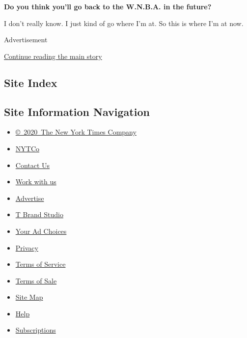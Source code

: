\textbf{Do you think you'll go back to the W.N.B.A. in the future?}

I don't really know. I just kind of go where I'm at. So this is where
I'm at now.

Advertisement

\protect\hyperlink{after-bottom}{Continue reading the main story}

\hypertarget{site-index}{%
\subsection{Site Index}\label{site-index}}

\hypertarget{site-information-navigation}{%
\subsection{Site Information
Navigation}\label{site-information-navigation}}

\begin{itemize}
\tightlist
\item
  \href{https://help.nytimes.com/hc/en-us/articles/115014792127-Copyright-notice}{©~2020~The
  New York Times Company}
\end{itemize}

\begin{itemize}
\tightlist
\item
  \href{https://www.nytco.com/}{NYTCo}
\item
  \href{https://help.nytimes.com/hc/en-us/articles/115015385887-Contact-Us}{Contact
  Us}
\item
  \href{https://www.nytco.com/careers/}{Work with us}
\item
  \href{https://nytmediakit.com/}{Advertise}
\item
  \href{http://www.tbrandstudio.com/}{T Brand Studio}
\item
  \href{https://www.nytimes.com/privacy/cookie-policy\#how-do-i-manage-trackers}{Your
  Ad Choices}
\item
  \href{https://www.nytimes.com/privacy}{Privacy}
\item
  \href{https://help.nytimes.com/hc/en-us/articles/115014893428-Terms-of-service}{Terms
  of Service}
\item
  \href{https://help.nytimes.com/hc/en-us/articles/115014893968-Terms-of-sale}{Terms
  of Sale}
\item
  \href{https://spiderbites.nytimes.com}{Site Map}
\item
  \href{https://help.nytimes.com/hc/en-us}{Help}
\item
  \href{https://www.nytimes.com/subscription?campaignId=37WXW}{Subscriptions}
\end{itemize}
